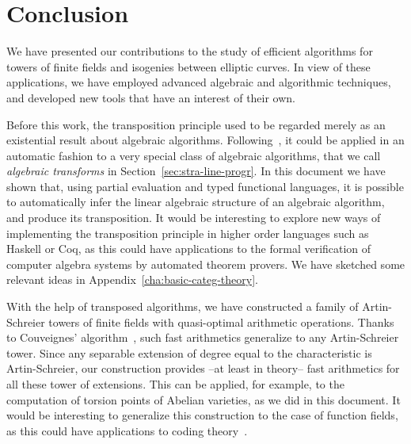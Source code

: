 \chapter*{Conclusion}

We have presented our contributions to the study of efficient
algorithms for towers of finite fields and isogenies between elliptic
curves. In view of these applications, we have employed advanced
algebraic and algorithmic techniques, and developed new tools that
have an interest of their own.

Before this work, the transposition principle used to be regarded
merely as an existential result about algebraic algorithms.
Following~\cite{bostan+lecerf+schost:tellegen}, it could be applied in
an automatic fashion to a very special class of algebraic algorithms,
that we call \emph{algebraic transforms} in
Section~\ref{sec:stra-line-progr}. In this document we have shown
that, using partial evaluation and typed functional languages, it is
possible to automatically infer the linear algebraic structure of an
algebraic algorithm, and produce its transposition.  It would be
interesting to explore new ways of implementing the transposition
principle in higher order languages such as Haskell or Coq, as this
could have applications to the formal verification of computer algebra
systems by automated theorem provers.  We have sketched some relevant
ideas in Appendix~\ref{cha:basic-categ-theory}.

With the help of transposed algorithms, we have constructed a family
of Artin-Schreier towers of finite fields with quasi-optimal
arithmetic operations. Thanks to Couveignes'
algorithm~\cite{couveignes00}, such fast arithmetics generalize to any
Artin-Schreier tower. Since any separable extension of degree equal to
the characteristic is Artin-Schreier, our construction provides --at
least in theory-- fast arithmetics for all these tower of extensions.
This can be applied, for example, to the computation of torsion points
of Abelian varieties, as we did in this document. It would be
interesting to generalize this construction to the case of function
fields, as this could have applications to coding
theory~\cite{garcia+stichtenoth96,shum-et-al01}.

